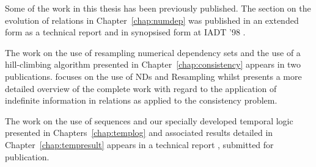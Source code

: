 
\begin{publications}

Some of the work in this thesis has been previously published. 
The section on the evolution of relations in Chapter~\ref{chap:numdep}
was published in an
extended form as a technical report \cite{cl96} and in synopsised
form at IADT '98 \cite{cl98c}.

\medskip

The work on the use of resampling numerical dependency sets and the
use of a hill-climbing algorithm presented in
Chapter~\ref{chap:consistency} appears in two
publications. \cite{cl98b} focuses on the use of NDs and Resampling
whilst \cite{cl98} presents a more detailed overview of the complete
work with regard to the application of indefinite information in
relations as applied to the consistency problem.

\medskip

The work on the use of sequences and our specially developed temporal
logic presented in Chapters~\ref{chap:templog} and associated results detailed in Chapter~\ref{chap:tempresult}
appears in a technical report \cite{cl98f}, submitted for
publication.

\end{publications}

